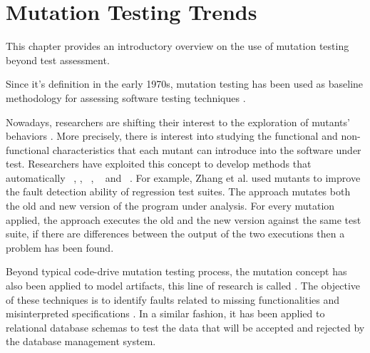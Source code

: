 
\chapter{Mutation Testing Trends}
\label{chapter:trends}



This chapter provides an introductory overview on the use of mutation testing beyond test assessment.

Since it's definition in the early 1970s, mutation testing has been used 
as baseline methodology for assessing software testing techniques \cite{chekam2017empirical}.


Nowadays, researchers are shifting their interest to the exploration of mutants' behaviors \cite{papadakis2019mutation}. 
More precisely, there is interest into studying the functional and non-functional characteristics that each mutant can introduce into the software under test.
Researchers have exploited this concept to develop methods that automatically ~\cite{zhang2016isomorphic},  \cite{papadakis2015metallaxis}, ~\cite{le2011genprog}, ~\cite{loise2017towards} and ~\cite{langdon2017genetic}.
For example, Zhang et al. \cite{zhang2016isomorphic} used mutants to improve the fault detection ability of regression test suites. The approach mutates both the old and new version of the program under analysis. For every mutation applied, the approach executes the old and the new version against the same test suite, if there are differences between the output of the two executions then a problem has been found.


Beyond typical code-drive mutation testing process, the mutation concept has also been applied to model artifacts, this line of research is called . The objective of these techniques is to identify faults related to missing functionalities and misinterpreted specifications \cite{devroey2016featured,belli2016model}.
In a similar fashion, it has been applied to relational database schemas \cite{wright2013efficient} to test the data that will be accepted and rejected by the database management system.

